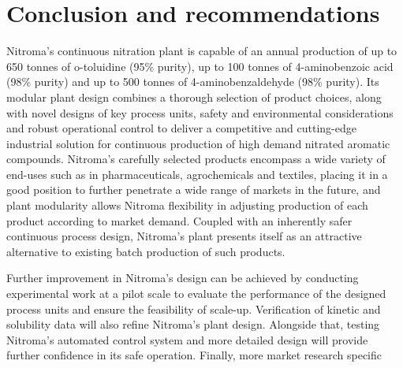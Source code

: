 \section*{Conclusion and recommendations}
Nitroma's continuous nitration plant is capable of an annual production of up to 650 tonnes of o-toluidine (95\% purity), up to 100 tonnes of 4-aminobenzoic acid (98\% purity) and up to 500 tonnes of 4-aminobenzaldehyde (98\% purity). Its modular plant design combines a thorough selection of product choices, along with novel designs of key process units, safety and environmental considerations and robust operational control to deliver a competitive and cutting-edge industrial solution for continuous production of high demand nitrated aromatic compounds. Nitroma's carefully selected products encompass a wide variety of end-uses such as in pharmaceuticals, agrochemicals and textiles, placing it in a good position to further penetrate a wide range of markets in the future, and plant modularity allows Nitroma flexibility in adjusting production of each product according to market demand. Coupled with an inherently safer continuous process design, Nitroma's plant presents itself as an attractive alternative to existing batch production of such products.

Further improvement in Nitroma's design can be achieved by conducting experimental work at a pilot scale to evaluate the performance of the designed process units and ensure the feasibility of scale-up. Verification of kinetic and solubility data will also refine Nitroma's plant design. Alongside that, testing Nitroma's automated control system and more detailed design will provide further confidence in its safe operation. Finally, more market research specific

